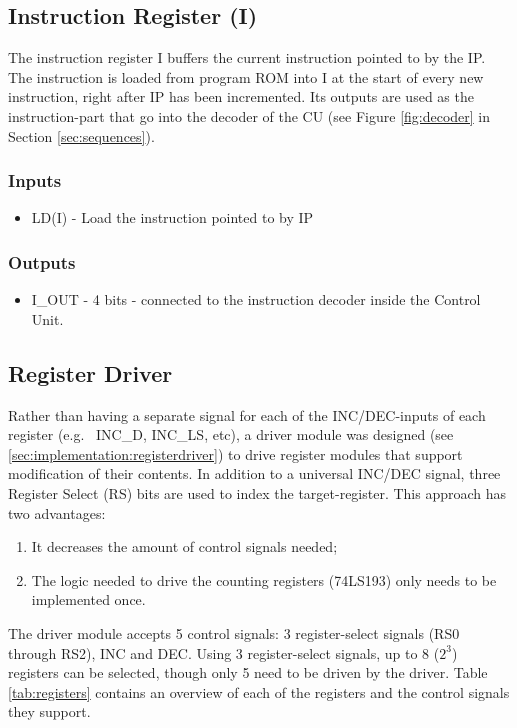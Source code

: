 \subsection{Instruction Register (I)} \label{sec:architecture:i}
The instruction register I buffers the current instruction pointed to by the IP. The instruction is loaded from program ROM into I at the start of every new instruction, right after IP has been incremented. Its outputs are used as the instruction-part that go into the decoder of the CU (see Figure \ref{fig:decoder} in Section \ref{sec:sequences}).


\subsubsection*{Inputs}
\begin{itemize}
\itemsep0em 
\item LD(I) - Load the instruction pointed to by IP
\end{itemize}

\subsubsection*{Outputs}
\begin{itemize}
\itemsep0em 
\item I\_OUT - 4 bits - connected to the instruction decoder inside the Control Unit.
\end{itemize}


\subsection{Register Driver} \label{sec:architecture:registerdriver}
Rather than having a separate signal for each of the INC/DEC-inputs of each register (e.g.~ INC\_D, INC\_LS, etc), a driver module was designed (see \ref{sec:implementation:registerdriver}) to drive register modules that support modification of their contents. In addition to a universal INC/DEC signal, three Register Select (RS) bits are used to index the target-register. This approach has two advantages:
\begin{enumerate}
\item It decreases the amount of control signals needed;
\item The logic needed to drive the counting registers (74LS193) only needs to be implemented once.
\end{enumerate}

The driver module accepts 5 control signals: 3 register-select signals (RS0 through RS2), INC and DEC. Using 3 register-select signals, up to 8 ($2^3$) registers can be selected, though only 5 need to be driven by the driver. Table \ref{tab:registers} contains an overview of each of the registers and the control signals they support.

